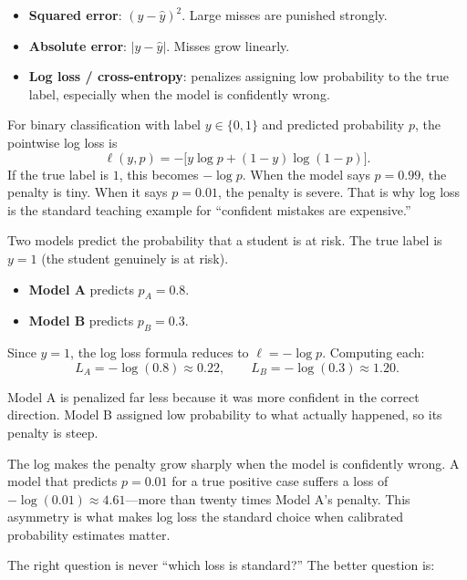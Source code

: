 \begin{itemize}[leftmargin=*]
\item \textbf{Squared error}: \((y-\hat{y})^2\). Large misses are punished strongly.
\item \textbf{Absolute error}: \(|y-\hat{y}|\). Misses grow linearly.
\item \textbf{Log loss / cross-entropy}: penalizes assigning low probability to the true label, especially when the model is confidently wrong.
\end{itemize}

For binary classification with label \(y \in \{0,1\}\) and predicted probability \(p\), the pointwise log loss is
\[
\ell(y,p) = -\bigl[y\log p + (1-y)\log(1-p)\bigr].
\]
If the true label is \(1\), this becomes \(-\log p\). When the model says \(p=0.99\), the penalty is tiny. When it says \(p=0.01\), the penalty is severe. That is why log loss is the standard teaching example for ``confident mistakes are expensive.''

\begin{example}
Two models predict the probability that a student is at risk. The true label is \(y=1\) (the student genuinely is at risk).

\begin{itemize}[leftmargin=*]
\item \textbf{Model A} predicts \(p_A = 0.8\).
\item \textbf{Model B} predicts \(p_B = 0.3\).
\end{itemize}

Since \(y=1\), the log loss formula reduces to \(\ell = -\log p\). Computing each:
\[
L_A = -\log(0.8) \approx 0.22,
\qquad
L_B = -\log(0.3) \approx 1.20.
\]

Model A is penalized far less because it was more confident in the correct direction. Model B assigned low probability to what actually happened, so its penalty is steep.

The log makes the penalty grow sharply when the model is confidently wrong. A model that predicts \(p = 0.01\) for a true positive case suffers a loss of \(-\log(0.01) \approx 4.61\)---more than twenty times Model A's penalty. This asymmetry is what makes log loss the standard choice when calibrated probability estimates matter.
\end{example}

The right question is never ``which loss is standard?'' The better question is:

